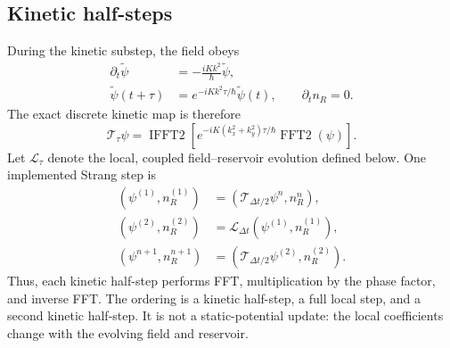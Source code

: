 \subsection{Kinetic half-steps}\label{sec:B.2}
During the kinetic substep, the field obeys
\begin{equation}
\begin{aligned}
\partial_t\widetilde\psi&=-\frac{iKk^2}{\hbar}\widetilde\psi,\\
\widetilde\psi(t+\tau)&=e^{-iKk^2\tau/\hbar}\widetilde\psi(t),
\qquad \partial_t n_R=0.
\end{aligned}\label{eq:B.kinetic}
\end{equation}
The exact discrete kinetic map is therefore
\begin{equation}
\mathcal T_\tau\psi=
\operatorname{IFFT2}\!\left[
e^{-iK(k_x^2+k_y^2)\tau/\hbar}
\operatorname{FFT2}(\psi)\right].\label{eq:B.kinetic-map}
\end{equation}
Let \(\mathcal L_\tau\) denote the local, coupled field--reservoir
evolution defined below. One implemented Strang step is
\begin{equation}
\begin{aligned}
(\psi^{(1)},n_R^{(1)})&=(\mathcal T_{\Delta t/2}\psi^n,n_R^n),\\
(\psi^{(2)},n_R^{(2)})&=\mathcal L_{\Delta t}
(\psi^{(1)},n_R^{(1)}),\\
(\psi^{n+1},n_R^{n+1})&=(\mathcal T_{\Delta t/2}\psi^{(2)},n_R^{(2)}).
\end{aligned}\label{eq:B.strang}
\end{equation}
Thus, each kinetic half-step performs FFT, multiplication by the phase
factor, and inverse FFT. The ordering is a kinetic half-step, a full local
step, and a second kinetic half-step. It is not a static-potential update:
the local coefficients change with the evolving field and reservoir.


